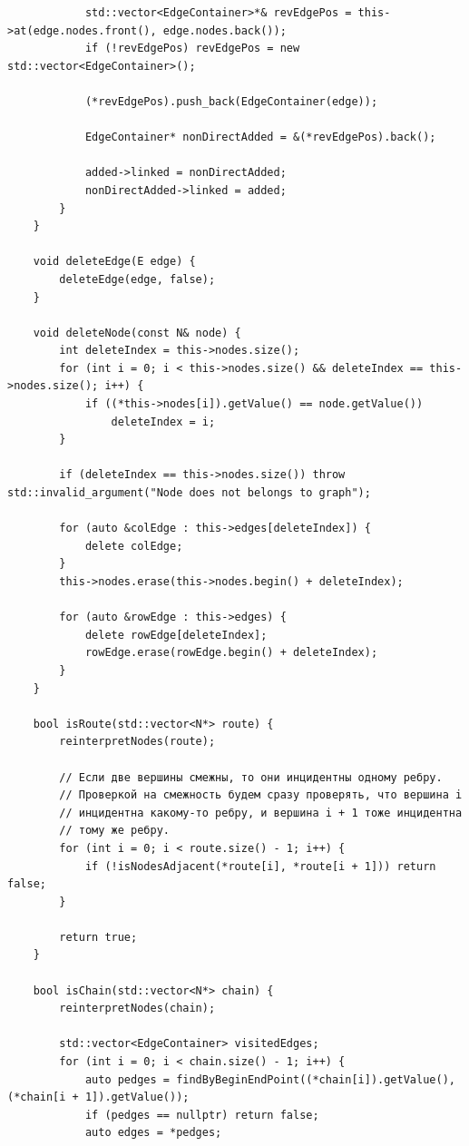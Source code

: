 \documentclass[a4paper,14pt]{extarticle}
\begin{document}
\begin{enumerate}[1.]
\begin{verbatim}
            std::vector<EdgeContainer>*& revEdgePos = this->at(edge.nodes.front(), edge.nodes.back());
            if (!revEdgePos) revEdgePos = new std::vector<EdgeContainer>();

            (*revEdgePos).push_back(EdgeContainer(edge));

            EdgeContainer* nonDirectAdded = &(*revEdgePos).back();

            added->linked = nonDirectAdded;
            nonDirectAdded->linked = added;
        }
    }

    void deleteEdge(E edge) {
        deleteEdge(edge, false);
    }

    void deleteNode(const N& node) {
        int deleteIndex = this->nodes.size();
        for (int i = 0; i < this->nodes.size() && deleteIndex == this->nodes.size(); i++) {
            if ((*this->nodes[i]).getValue() == node.getValue())
                deleteIndex = i;
        }

        if (deleteIndex == this->nodes.size()) throw std::invalid_argument("Node does not belongs to graph");

        for (auto &colEdge : this->edges[deleteIndex]) {
            delete colEdge;
        }
        this->nodes.erase(this->nodes.begin() + deleteIndex);

        for (auto &rowEdge : this->edges) {
            delete rowEdge[deleteIndex];
            rowEdge.erase(rowEdge.begin() + deleteIndex);
        }
    }

    bool isRoute(std::vector<N*> route) {
        reinterpretNodes(route);

        // Если две вершины смежны, то они инцидентны одному ребру.
        // Проверкой на смежность будем сразу проверять, что вершина i
        // инцидентна какому-то ребру, и вершина i + 1 тоже инцидентна
        // тому же ребру.
        for (int i = 0; i < route.size() - 1; i++) {
            if (!isNodesAdjacent(*route[i], *route[i + 1])) return false;
        }

        return true;
    }

    bool isChain(std::vector<N*> chain) {
        reinterpretNodes(chain);
        
        std::vector<EdgeContainer> visitedEdges;
        for (int i = 0; i < chain.size() - 1; i++) {
            auto pedges = findByBeginEndPoint((*chain[i]).getValue(), (*chain[i + 1]).getValue());
            if (pedges == nullptr) return false;
            auto edges = *pedges;


\end{verbatim}
\end{enumerate}
\end{document}
